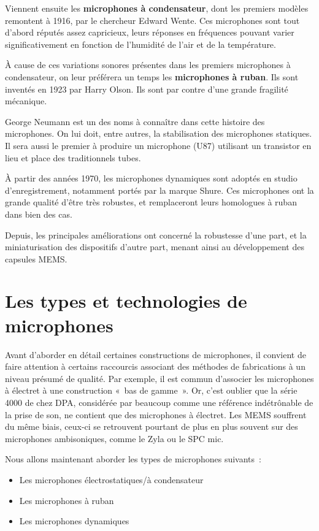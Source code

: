 \documentclass[
  letterpaper,
  DIV=11,
  numbers=noendperiod]{scrreprt}
\providecommand{\tightlist}{%
  \setlength{\itemsep}{0pt}\setlength{\parskip}{0pt}}\usepackage{longtable,booktabs,array}
\begin{document}
Viennent ensuite les \textbf{microphones à condensateur}, dont les
premiers modèles remontent à 1916, par le chercheur Edward Wente. Ces
microphones sont tout d'abord réputés assez capricieux, leurs réponses
en fréquences pouvant varier significativement en fonction de l'humidité
de l'air et de la température.

À cause de ces variations sonores présentes dans les premiers
microphones à condensateur, on leur préférera un temps les
\textbf{microphones à ruban}. Ils sont inventés en 1923 par Harry Olson.
Ils sont par contre d'une grande fragilité mécanique.

George Neumann est un des noms à connaître dans cette histoire des
microphones. On lui doit, entre autres, la stabilisation des microphones
statiques. Il sera aussi le premier à produire un microphone (U87)
utilisant un transistor en lieu et place des traditionnels tubes.

À partir des années 1970, les microphones dynamiques sont adoptés en
studio d'enregistrement, notamment portés par la marque Shure. Ces
microphones ont la grande qualité d'être très robustes, et remplaceront
leurs homologues à ruban dans bien des cas.

Depuis, les principales améliorations ont concerné la robustesse d'une
part, et la miniaturisation des dispositifs d'autre part, menant ainsi
au développement des capsules MEMS.

\hypertarget{les-types-et-technologies-de-microphones}{%
\section{Les types et technologies de
microphones}\label{les-types-et-technologies-de-microphones}}

Avant d'aborder en détail certaines constructions de microphones, il
convient de faire attention à certains raccourcis associant des méthodes
de fabrications à un niveau présumé de qualité. Par exemple, il est
commun d'associer les microphones à électret à une construction «~bas de
gamme~». Or, c'est oublier que la série 4000 de chez DPA, considérée par
beaucoup comme une référence indétrônable de la prise de son, ne
contient que des microphones à électret. Les MEMS souffrent du même
biais, ceux-ci se retrouvent pourtant de plus en plus souvent sur des
microphones ambisoniques, comme le Zyla ou le SPC mic.

Nous allons maintenant aborder les types de microphones suivants~:

\begin{itemize}
\tightlist
\item
  Les microphones électrostatiques/à condensateur
\item
  Les microphones à ruban
\item
  Les microphones dynamiques
\end{itemize}
\end{document}
